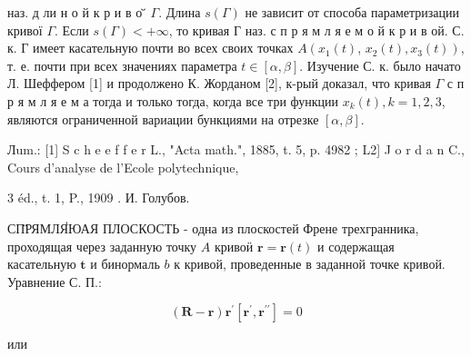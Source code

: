 \documentclass[10pt]{article}
\begin{document}
наз. д ли н о й к р и в о ̆̈ $\Gamma$. Длина $s(\Gamma)$ не зависит от способа параметризации кривої $\Gamma$. Если $s(\Gamma)<+\infty$, то кривая Г наз. с п р я м л я е м о й к р и в ой. С. к. Г имеет касательную почти во всех своих точках $A\left(x_{1}(t)\right.$, $\left.x_{2}(t), x_{3}(t)\right)$, т. е. почти при всех значениях параметра $t \in[\alpha, \beta]$. Изучение С. к. было начато Л. Шеффером [1] и продолжено К. Жорданом [2], к-рый доказал, что кривая $\Gamma$ с п р я м л я е м а тогда и только тогда, когда все три функции $x_{k}(t), k=1,2,3$, являются ограниченной вариации бункциями на отрезке $[\alpha, \beta]$.



Лum.: [1] S c h e e f f e r L., "Acta math.", 1885, t. 5, p. 4982 ; L2] J o r d a n C., Cours d'analyse de l'Ecole polytechnique,

3 éd., t. 1, P., 1909 . И. Голубов.



СП̈РЯМЛЯ่ЮАЯ ПЛОСКОСТЬ - одна из плоскостей Френе трехгранника, проходящая через заданную точку $A$ кривоӥ $\boldsymbol{r}=\boldsymbol{r}(t)$ и содержащая касательную $\boldsymbol{t}$ и бинормаль $b$ к кривой, проведенные в заданной точке кривой. Уравнение С. П.:



\[

(\boldsymbol{R}-\boldsymbol{r}) \boldsymbol{r}^{\prime}\left[\boldsymbol{r}^{\prime}, \boldsymbol{r}^{\prime \prime}\right]=0

\]



или
\end{document}

